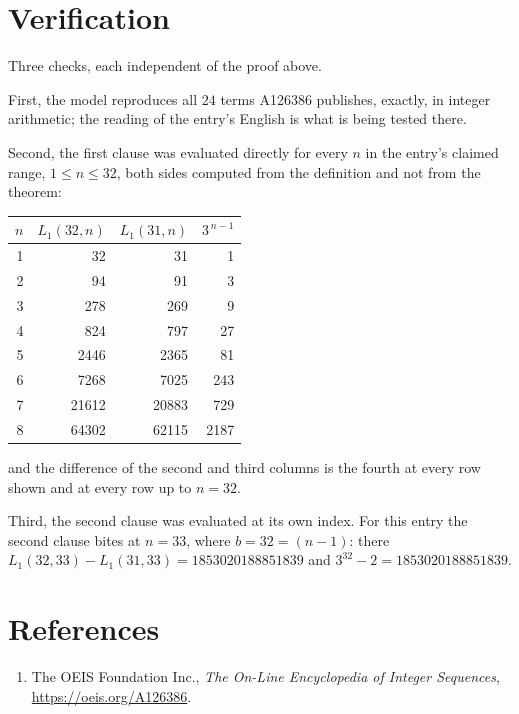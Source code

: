 \documentclass[11pt,a4paper]{article}
\theoremstyle{plain}
\theoremstyle{definition}
\begin{document}
\section{Verification}

Three checks, each independent of the proof above.

First, the model reproduces all $24$ terms A126386 publishes, exactly, in integer
arithmetic; the reading of the entry's English is what is being tested there.

Second, the first clause was evaluated directly for every $n$ in the entry's claimed range,
$1\le n\le32$, both sides computed from the definition and not from the theorem:

\begin{center}
\begin{tabular}{rrrr}
$n$ & $L_{1}(32,n)$ & $L_{1}(31,n)$ & $3^{\,n-1}$ \\ \hline
1 & 32 & 31 & 1 \\
2 & 94 & 91 & 3 \\
3 & 278 & 269 & 9 \\
4 & 824 & 797 & 27 \\
5 & 2446 & 2365 & 81 \\
6 & 7268 & 7025 & 243 \\
7 & 21612 & 20883 & 729 \\
8 & 64302 & 62115 & 2187 \\
\end{tabular}
\end{center}

\noindent and the difference of the second and third columns is the fourth at every row shown
and at every row up to $n=32$.

Third, the second clause was evaluated at its own index. For this entry the second clause bites at $n=33$, where $b=32=(n-1)$: there $L_{1}(32,33)-L_{1}(31,33)=1853020188851839$ and $3^{32}-2=1853020188851839$.

\section*{References}
\begin{enumerate}
\item The OEIS Foundation Inc., \emph{The On-Line Encyclopedia of Integer Sequences},
\url{https://oeis.org/A126386}.
\end{enumerate}
\end{document}
